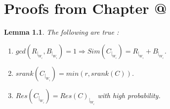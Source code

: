\documentclass[12pt]{caltech_thesis}
\makeatletter
\theoremstyle{plain}
\newtheorem{lemma}{Lemma}
\theoremstyle{definition}
\newcommand{\PP}{\mathbb{P}}
\newcommand*{\rom}[1]{\expandafter\@slowromancap\romannumeral #1@}
\makeatother
\begin{document}
\chapter{Proofs from Chapter \rom{4}}\label{appendix:proofsfromchap4}
\begin{lemma}\label{lemma:projproof}
The following are true :
\begin{enumerate}
 \item $gcd(R_{|_{W_i}}, B_{|_{W_i}})=1 \Rightarrow Sim(C_{|_{W_i}}) = R_{|_{W_i}} + B_{|_{W_i}}$.
 \item  $srank(C_{|_{W_i}}) = min(r, srank(C))$.
\item $Res(C_{|_{W_i}}) = Res(C)_{|_{W_i}}$ with high probability.
\end{enumerate}
\end{lemma}
\end{document}
